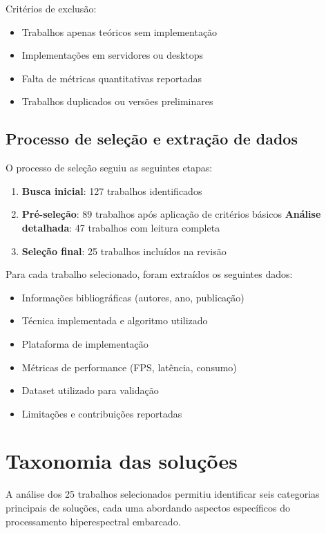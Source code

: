 Critérios de exclusão:
\begin{itemize}
    \item Trabalhos apenas teóricos sem implementação
    \item Implementações em servidores ou desktops
    \item Falta de métricas quantitativas reportadas
    \item Trabalhos duplicados ou versões preliminares
\end{itemize}

\subsection{Processo de seleção e extração de dados}\label{subsec:processo_selecao}

O processo de seleção seguiu as seguintes etapas:
\begin{enumerate}
    \item \textbf{Busca inicial}: 127 trabalhos identificados
    \item \textbf{Pré-seleção}: 89 trabalhos após aplicação de critérios básicos
    \textbf{Análise detalhada}: 47 trabalhos com leitura completa
    \item \textbf{Seleção final}: 25 trabalhos incluídos na revisão
\end{enumerate}

Para cada trabalho selecionado, foram extraídos os seguintes dados:
\begin{itemize}
    \item Informações bibliográficas (autores, ano, publicação)
    \item Técnica implementada e algoritmo utilizado
    \item Plataforma de implementação
    \item Métricas de performance (FPS, latência, consumo)
    \item Dataset utilizado para validação
    \item Limitações e contribuições reportadas
\end{itemize}

\section{Taxonomia das soluções}\label{sec:taxonomia_solucoes}

A análise dos 25 trabalhos selecionados permitiu identificar seis categorias principais de soluções, cada uma abordando aspectos específicos do processamento hiperespectral embarcado.

